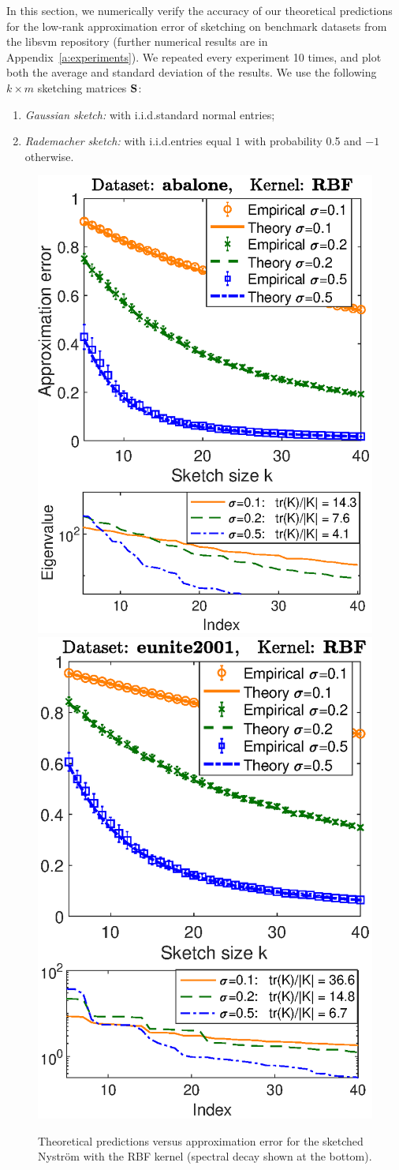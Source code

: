 \documentclass{article}
\begin{document}
In this section, we numerically verify the accuracy of our theoretical
predictions for the low-rank approximation error of sketching on
benchmark datasets from the libsvm repository 
\cite{libsvm} (further numerical results are in
Appendix~\ref{a:experiments}). We repeated every experiment 10 times,
and plot 
both the average and standard deviation of the results. We use the
following $k\times m$ sketching matrices $\S$:\vspace{-1mm}
\begin{enumerate}
\item \emph{Gaussian sketch:} with i.i.d.\@ standard normal entries;
\item \emph{Rademacher sketch:} with
  i.i.d.\@ entries equal $1$ with probability 0.5 and $-1$ otherwise.
\end{enumerate}
\vspace{-2mm}

\ifisarxiv
\begin{figure}
  \centering
\includegraphics[width=.43\textwidth]{abalone-nystrom}\nobreak\includegraphics[width=.43\textwidth]{eunite-nystrom}
  \caption{Theoretical predictions versus approximation error for the
    sketched Nystr\"om with the RBF kernel
    (spectral decay shown at the bottom).}\label{f:nystrom}
\end{figure}
\fi
\end{document}
